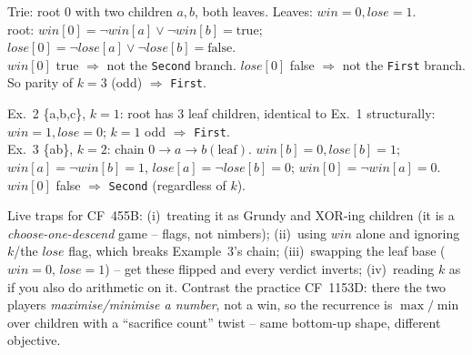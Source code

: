 
\begin{tracebox}[Verdict logic on Example~1: \{a, b\}, $k=3$]
Trie: root $0$ with two children $a, b$, both leaves. Leaves: $win=0,lose=1$.\\
root: $win[0] = \neg win[a] \vee \neg win[b] = \text{true}$; \;
$lose[0] = \neg lose[a] \vee \neg lose[b] = \text{false}$.\\
$win[0]$ true $\Rightarrow$ not the \texttt{Second} branch. $lose[0]$ false $\Rightarrow$ not
the \texttt{First} branch. So parity of $k=3$ (odd) $\Rightarrow$ \texttt{First}. \checkmark
\end{tracebox}

\begin{tracebox}
Ex.~2 \{a,b,c\}, $k=1$: root has 3 leaf children, identical to Ex.~1 structurally:
$win=1, lose=0$; $k=1$ odd $\Rightarrow$ \texttt{First}. \checkmark\\
Ex.~3 \{ab\}, $k=2$: chain $0 \to a \to b(\text{leaf})$. $win[b]=0,lose[b]=1$;
$win[a]=\neg win[b]=1$, $lose[a]=\neg lose[b]=0$; $win[0]=\neg win[a]=0$. $win[0]$
false $\Rightarrow$ \texttt{Second} (regardless of $k$). \checkmark
\end{tracebox}

\begin{warningbox}
Live traps for CF~455B: (i)~treating it as Grundy and XOR-ing children (it is a
\emph{choose-one-descend} game -- flags, not nimbers); (ii)~using $\mathit{win}$ alone and
ignoring $k$/the $\mathit{lose}$ flag, which breaks Example~3's chain; (iii)~swapping the
leaf base ($\mathit{win}=0$, $\mathit{lose}=1$) -- get these flipped and every verdict
inverts; (iv)~reading $k$ as  if you also do arithmetic on it. Contrast the
practice CF~1153D: there the two players \emph{maximise/minimise a number}, not a win, so
the recurrence is $\max/\min$ over children with a ``sacrifice count'' twist -- same
bottom-up shape, different objective.
\end{warningbox}

